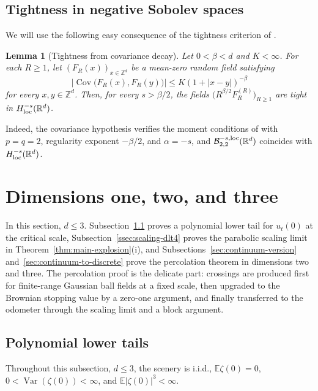 \documentclass[11pt]{amsart}
\theoremstyle{plain}
\newtheorem{lemma}[theorem]{Lemma}
\theoremstyle{definition}
\newcommand{\Z}{\mathbb{Z}}
\newcommand{\R}{\mathbb{R}}
\newcommand{\E}{\mathbb{E}}
\DeclareMathOperator{\Var}{Var}
\DeclareMathOperator{\Cov}{Cov}
\begin{document}
	\subsection{Tightness in negative Sobolev spaces}\label{ssec:sobolev-tightness}
	We will use the following easy consequence of the tightness
	criterion of \citet{FurlanMourrat}.

	\begin{lemma}[Tightness from covariance decay]\label{lem:sobolev-tightness}
		Let $0<\beta<d$ and $K<\infty$. For each $R\geq1$, let
		$(F_R(x))_{x\in\Z^d}$ be a mean-zero random field satisfying
		\[
			\bigl|\Cov\bigl(F_R(x),F_R(y)\bigr)\bigr|
			\leq K(1+|x-y|)^{-\beta}
		\]
		for every $x,y\in\Z^d$. Then, for every $s>\beta/2$, the fields
		$\bigl(R^{\beta/2}F_R^{(R)}\bigr)_{R\geq1}$ are tight in
		$H^{-s}_{\rm loc}(\R^d)$.
	\end{lemma}

	Indeed, the covariance hypothesis verifies the moment conditions of
	\citet[Theorem~2.30]{FurlanMourrat} with $p=q=2$, regularity exponent
	$-\beta/2$, and $\alpha=-s$, and
	$\mathcal B^{-s,{\rm loc}}_{2,2}(\R^d)$ coincides with
	$H^{-s}_{\rm loc}(\R^d)$.


	\section{Dimensions one, two, and three}\label{sec:dim123}

In this section, $d\leq3$. Subsection~\ref{ssec:expl-d123} proves a
polynomial lower tail for $u_t(0)$ at the critical scale,
Subsection~\ref{ssec:scaling-dlt4} proves the parabolic scaling limit in
Theorem~\ref{thm:main-explosion}(i), and
Subsections~\ref{sec:continuum-version} and~\ref{sec:continuum-to-discrete}
prove the percolation theorem in dimensions two and three. The percolation
proof is the delicate part: crossings are produced first for finite-range
Gaussian ball fields at a fixed scale, then upgraded to the Brownian stopping
value by a zero-one argument, and finally transferred to the odometer through
the scaling limit and a block argument.

\subsection{Polynomial lower tails}\label{ssec:expl-d123}

	Throughout this subsection, $d\leq3$, the scenery is i.i.d.,
	$\E\zeta(0)=0$, $0<\Var(\zeta(0))<\infty$, and
	$\E|\zeta(0)|^3<\infty$.
\end{document}
